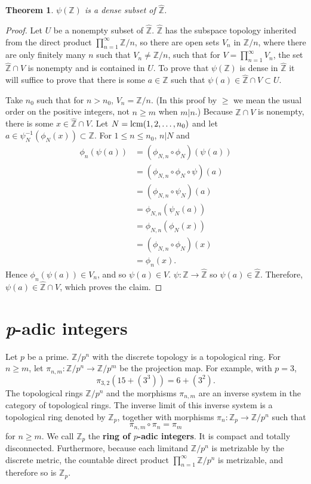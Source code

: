 \documentclass{article}
\newcommand{\lcm}{\ensuremath\mathrm{lcm}}
\newtheorem{theorem}{Theorem}
\theoremstyle{definition}
\begin{document}
\begin{theorem}
$\psi(\mathbb{Z})$ is a dense subset of $\widehat{\mathbb{Z}}$.
\end{theorem}
\begin{proof}
Let $U$ be a nonempty subset of $\widehat{\mathbb{Z}}$. $\widehat{\mathbb{Z}}$ has the subspace topology inherited
from the direct product $\prod_{n=1}^\infty \mathbb{Z}/n$,
so 
there are open sets $V_n$ in $\mathbb{Z}/n$, where there are only finitely many $n$ such that $V_n \neq \mathbb{Z}/n$,
such that for $V = \prod_{n=1}^\infty V_n$, the set $\widehat{\mathbb{Z}} \cap V$ is nonempty and is contained in $U$. 
To prove that $\psi(\mathbb{Z})$ is dense in $\widehat{\mathbb{Z}}$ it will suffice to prove that
there is some $a \in \mathbb{Z}$ such that $\psi(a) \in \widehat{\mathbb{Z}} \cap V \subset  U$. 

Take $n_0$ such that for $n > n_0$, $V_n = \mathbb{Z}/n$. (In this proof by $\geq$ we mean the usual order on the positive integers, not $n \geq m$ when
$m|n$.)
Because  $\widehat{\mathbb{Z}} \cap V$ is nonempty, there is some $x \in  \widehat{\mathbb{Z}} \cap V$. 
Let $N=\lcm(1,2,\ldots,n_0)$ and let $a \in \psi_N^{-1}(\phi_N(x)) \subset \mathbb{Z}$. For $1 \leq n \leq n_0$,  $n|N$ and
\begin{align*}
\phi_n(\psi(a))&=(\phi_{N,n} \circ \phi_N)(\psi(a))\\
&=(\phi_{N,n} \circ \phi_N \circ \psi)(a)\\
&=(\phi_{N,n} \circ \psi_N)(a)\\
&=\phi_{N,n}(\psi_N(a))\\
&=\phi_{N,n}(\phi_N(x))\\
&=(\phi_{N,n} \circ \phi_N)(x)\\
&=\phi_n(x).
\end{align*}
Hence $\phi_n(\psi(a)) \in V_n$, and so $\psi(a) \in V$.
$\psi:\mathbb{Z} \to \widehat{\mathbb{Z}}$ so  $\psi(a) \in \widehat{\mathbb{Z}}$. Therefore,
$\psi(a) \in \widehat{\mathbb{Z}} \cap V$, which proves the claim.
\end{proof}




\section{{\em p}-adic integers}
Let $p$ be a prime. $\mathbb{Z}/p^n$ with the discrete topology is a topological ring. 
For $n \geq m$, let $\pi_{n,m}:\mathbb{Z}/p^n \to \mathbb{Z}/p^m$
be the projection map. For example, with $p=3$,
\[
\pi_{3,2}(15+(3^3)) = 6+(3^2).
\]
The topological rings $\mathbb{Z}/p^n$ and the morphisms $\pi_{n,m}$ are an inverse system in the category of topological rings. 
The inverse limit of this inverse system is a topological ring denoted by $\mathbb{Z}_p$, together with morphisms
$\pi_n:\mathbb{Z}_p \to \mathbb{Z}/p^n$ such that
\[
\pi_{n,m} \circ \pi_n = \pi_m
\]
 for $n \geq m$.
We call $\mathbb{Z}_p$ the \textbf{ring of $p$-adic integers}. It is compact and totally disconnected. 
Furthermore, because each limitand $\mathbb{Z}/p^n$ is metrizable by the discrete metric, the countable direct product
$\prod_{n=1}^\infty \mathbb{Z}/p^n$ is metrizable, and therefore so is $\mathbb{Z}_p$. 
\end{document}
